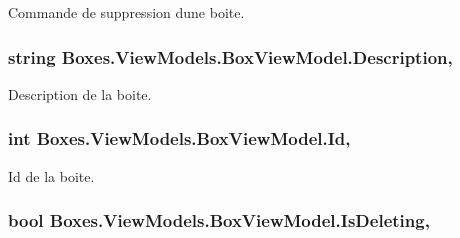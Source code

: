 Commande de suppression d\textquotesingle{}une boite. 

\subsubsection[{\texorpdfstring{Description}{Description}}]{\setlength{\rightskip}{0pt plus 5cm}string Boxes.\+View\+Models.\+Box\+View\+Model.\+Description\hspace{0.3cm}{\ttfamily [get]}, {\ttfamily [set]}}\hypertarget{class_boxes_1_1_view_models_1_1_box_view_model_ade800bd7096f87f32f5089ab1fb631d0}{}\label{class_boxes_1_1_view_models_1_1_box_view_model_ade800bd7096f87f32f5089ab1fb631d0}


Description de la boite. 

\subsubsection[{\texorpdfstring{Id}{Id}}]{\setlength{\rightskip}{0pt plus 5cm}int Boxes.\+View\+Models.\+Box\+View\+Model.\+Id\hspace{0.3cm}{\ttfamily [get]}, {\ttfamily [set]}}\hypertarget{class_boxes_1_1_view_models_1_1_box_view_model_a21768b16e75b17cae9e7a66a909b4bcd}{}\label{class_boxes_1_1_view_models_1_1_box_view_model_a21768b16e75b17cae9e7a66a909b4bcd}


Id de la boite. 

\subsubsection[{\texorpdfstring{Is\+Deleting}{IsDeleting}}]{\setlength{\rightskip}{0pt plus 5cm}bool Boxes.\+View\+Models.\+Box\+View\+Model.\+Is\+Deleting\hspace{0.3cm}{\ttfamily [get]}, {\ttfamily [set]}}\hypertarget{class_boxes_1_1_view_models_1_1_box_view_model_ad64c3a1d77c24bf51232dd108c832fc6}{}\label{class_boxes_1_1_view_models_1_1_box_view_model_ad64c3a1d77c24bf51232dd108c832fc6}


